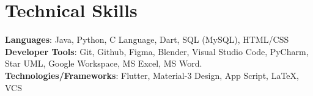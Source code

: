 \documentclass[a4paper,11pt]{article}
\begin{document}
\section{Technical Skills}
 \begin{itemize}[leftmargin=0.15in, label={}]
    \small{\item{
     \textbf{Languages}{: Java, Python, C Language, Dart, SQL (MySQL), HTML/CSS} \\
     \textbf{Developer Tools}{: Git, Github, Figma, Blender, Visual Studio Code, PyCharm, Star UML, Google Workspace, MS Excel, MS Word.} \\
     \textbf{Technologies/Frameworks}{: Flutter, Material-3 Design, App Script, \LaTeX, VCS} \\
    }}
 \end{itemize}


\end{document}
